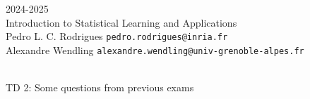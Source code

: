 \begin{flushleft}
 \hfill {} 2024-2025 \\
Introduction to Statistical Learning and Applications \\
Pedro L. C. Rodrigues   \hfill  \texttt{pedro.rodrigues@inria.fr} \\
Alexandre Wendling \hfill \texttt{alexandre.wendling@univ-grenoble-alpes.fr } \\

\HRuleTop\\
\begin{center}
\Large{TD 2: Some questions from previous exams}
\end{center}
\HRuleBottom
\end{flushleft}
